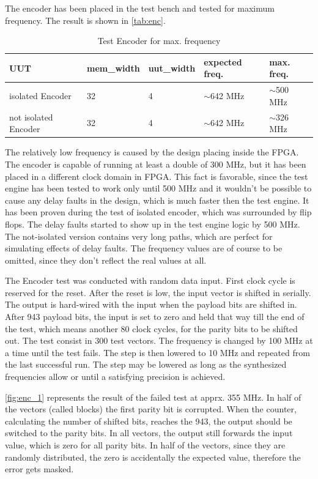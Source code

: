 The encoder has been placed in the test bench and tested for maximum frequency. The result is shown in \autoref{tab:enc}.

\begin{table}[]
\begin{tabular}{@{}lllll@{}}
\toprule
UUT                       &mem\_width   &uut\_width &expected freq. &max. freq.\\ 
\midrule
isolated Encoder                  & 32          & 4      & $\sim$642 MHz & $\sim$500 MHz \\
not isolated Encoder              & 32          & 4      & $\sim$642 MHz & $\sim$326 MHz \\
\bottomrule
\end{tabular}
\centering
\caption{Test Encoder for max. frequency}\label{tab:enc}
\end{table}

The relatively low frequency is caused by the design placing inside the FPGA. The encoder is capable of running at least a double of 300 MHz, but it has been placed in a different clock domain in FPGA. This fact is favorable, since the test engine has been tested to work only until 500 MHz and it wouldn't be possible to cause any delay faults in the design, which is much faster then the test engine. It has been proven during the test of isolated encoder, which was surrounded by flip flops. The delay faults started to show up in the test engine logic by 500 MHz. The not-isolated version contains very long paths, which are perfect for simulating effects of delay faults. The frequency values are of course to be omitted, since they don't reflect the real values at all. 

The Encoder test was conducted with random data input. First clock cycle is reserved for the reset. After the reset is low, the input vector is shifted in serially. The output is hard-wired with the input when the payload bits are shifted in. After 943 payload bits, the input is set to zero and held that way till the end of the test, which means another 80 clock cycles, for the parity bits to be shifted out. The test consist in 300 test vectors. The frequency is changed by 100 MHz at a time until the test fails. The step is then lowered to 10 MHz and repeated from the last successful run. The step may be lowered as long as the synthesized frequencies allow or until a satisfying precision is achieved.

\autoref{fig:enc_1} represents the result of the failed test at apprx. 355 MHz. In half of the vectors (called blocks) the first parity bit is corrupted. When the counter, calculating the number of shifted bits, reaches the 943, the output should be switched to the parity bits. In all vectors, the output still forwards the input value, which is zero for all parity bits. In half of the vectors, since they are randomly distributed, the zero is accidentally the expected value, therefore the error gets masked.

